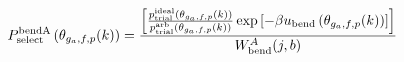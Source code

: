 \documentclass[12pt]{article}
\begin{document}
\begin{displaymath}
P_{\rm select}^{\rm bend A}\left(\theta_{g_a,f,p}(k)\right) = 
{{
\left[
{{p_{\rm trial}^{\rm ideal}\left(\theta_{g_a,f,p}(k)\right)}\over{ p_{\rm trial}^{\rm arb}\left(\theta_{g_a,f,p}(k)\right)}}
\exp\left[-\beta u_{\rm bend}\left(\theta_{g_a,f,p}(k)\right)\right]
\right]
}
\over
{
W_{\rm bend}^{A}(j,b)
}}
\end{displaymath}
\end{document}
